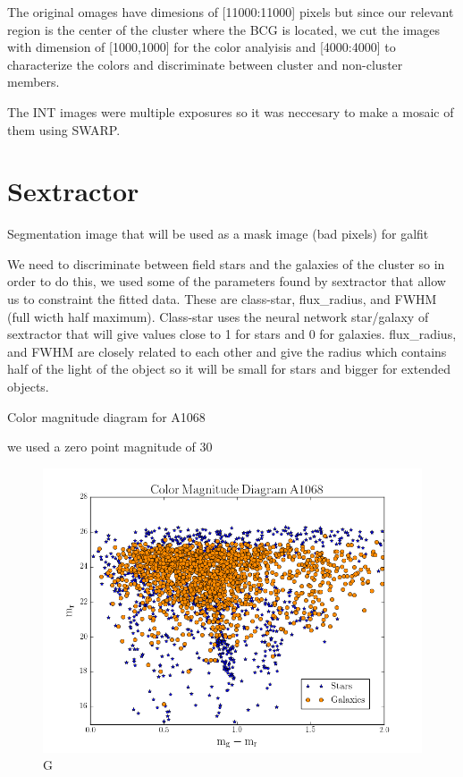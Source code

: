 The original omages have dimesions of [11000:11000] pixels but since our relevant region is the center of the cluster where the BCG is located, we cut the images with dimension of [1000,1000] for the color analyisis and [4000:4000] to characterize the colors and discriminate between cluster and non-cluster members.

The INT images were multiple exposures so it was neccesary to make a mosaic of them using SWARP.

\section{Sextractor}

Segmentation image that will be used as a mask image (bad pixels) for galfit

We need to discriminate between field stars and the galaxies of the cluster so in order to do this, we used some of the parameters found by sextractor that allow us to constraint the fitted data. These are class-star, flux\_radius, and FWHM (full wicth half maximum). Class-star uses the neural network star/galaxy of sextractor that will give values close to 1 for stars and 0 for galaxies. flux\_radius, and FWHM are closely related to each other and give the radius which contains half of the light of the object so it will be small for stars and bigger for extended objects.



Color magnitude diagram for A1068

we used a zero point magnitude of 30

\begin{figure}[H]
\centering
\includegraphics[width=12cm]{images/color mag.png}
\caption[M]{G}
\end{figure}

